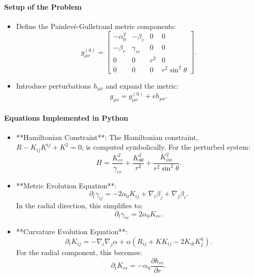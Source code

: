 \documentclass[12pt]{article}
\begin{document}
\paragraph{Setup of the Problem}
\begin{itemize}
    \item Define the Painlevé-Gullstrand metric components:
    \[
    g_{\mu\nu}^{(0)} = 
    \begin{bmatrix}
    -\alpha_0^2 & -\beta_r & 0 & 0 \\
    -\beta_r & \gamma_{rr} & 0 & 0 \\
    0 & 0 & r^2 & 0 \\
    0 & 0 & 0 & r^2 \sin^2\theta
    \end{bmatrix}.
    \]
    \item Introduce perturbations $h_{\mu\nu}$ and expand the metric:
    \[
    g_{\mu\nu} = g_{\mu\nu}^{(0)} + \epsilon h_{\mu\nu}.
    \]
\end{itemize}

\paragraph{Equations Implemented in Python}
\begin{itemize}
    \item **Hamiltonian Constraint**: The Hamiltonian constraint, $R - K_{ij}K^{ij} + K^2 = 0$, is computed symbolically. For the perturbed system:
    \[
    H = \frac{K_{rr}^2}{\gamma_{rr}} + \frac{K_{\theta\theta}^2}{r^2} + \frac{K_{\phi\phi}^2}{r^2 \sin^2\theta}.
    \]
    \item **Metric Evolution Equation**:
    \[
    \partial_t \gamma_{ij} = -2\alpha_0 K_{ij} + \nabla_i \beta_j + \nabla_j \beta_i.
    \]
    In the radial direction, this simplifies to:
    \[
    \partial_t \gamma_{rr} = 2\alpha_0 K_{rr}.
    \]
    \item **Curvature Evolution Equation**:
    \[
    \partial_t K_{ij} = -\nabla_i \nabla_j \alpha + \alpha (R_{ij} + K K_{ij} - 2K_{ik}K^k_j).
    \]
    For the radial component, this becomes:
    \[
    \partial_t K_{rr} = -\alpha_0 \frac{\partial h_{rr}}{\partial r}.
    \]
\end{itemize}
\end{document}
